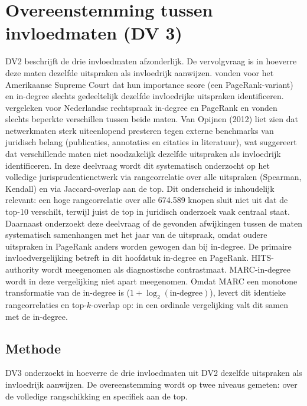 \documentclass[a4paper, 12pt]{report}
\begin{document}
\chapter{Overeenstemming tussen invloedmaten (DV 3)}
\label{ch:dv3}
DV2 beschrijft de drie invloedmaten afzonderlijk. De vervolgvraag is in hoeverre deze maten dezelfde uitspraken als invloedrijk aanwijzen. \textcite{fowler2008} vonden voor het Amerikaanse Supreme Court dat hun importance score (een PageRank-variant) en in-degree slechts gedeeltelijk dezelfde invloedrijke uitspraken identificeren. \textcite{winkels2011} vergeleken voor Nederlandse rechtspraak in-degree en PageRank en vonden slechts beperkte verschillen tussen beide maten. Van Opijnen (2012) liet zien dat netwerkmaten sterk uiteenlopend presteren tegen externe benchmarks van juridisch belang (publicaties, annotaties en citaties in literatuur), wat suggereert dat verschillende maten niet noodzakelijk dezelfde uitspraken als invloedrijk identificeren. In deze deelvraag wordt dit systematisch onderzocht op het volledige jurisprudentienetwerk via rangcorrelatie over alle uitspraken (Spearman, Kendall) en via Jaccard-overlap aan de top. Dit onderscheid is inhoudelijk relevant: een hoge rangcorrelatie over alle 674.589 knopen sluit niet uit dat de top-10 verschilt, terwijl juist de top in juridisch onderzoek vaak centraal staat. Daarnaast onderzoekt deze deelvraag of de gevonden afwijkingen tussen de maten systematisch samenhangen met het jaar van de uitspraak, omdat oudere uitspraken in PageRank anders worden gewogen dan bij in-degree. De primaire invloedvergelijking betreft in dit hoofdstuk in-degree en PageRank. HITS-authority wordt meegenomen als diagnostische contrastmaat. MARC-in-degree wordt in deze vergelijking niet apart meegenomen. Omdat MARC een monotone transformatie van de in-degree is ($1 + \log_2(\text{in-degree})$), levert dit identieke rangcorrelaties en top-$k$-overlap op: in een ordinale vergelijking valt dit samen met de in-degree.



\section{Methode}

DV3 onderzoekt in hoeverre de drie invloedmaten uit DV2 dezelfde uitspraken als invloedrijk aanwijzen. De overeenstemming wordt op twee niveaus gemeten: over de volledige rangschikking en specifiek aan de top.
\end{document}
